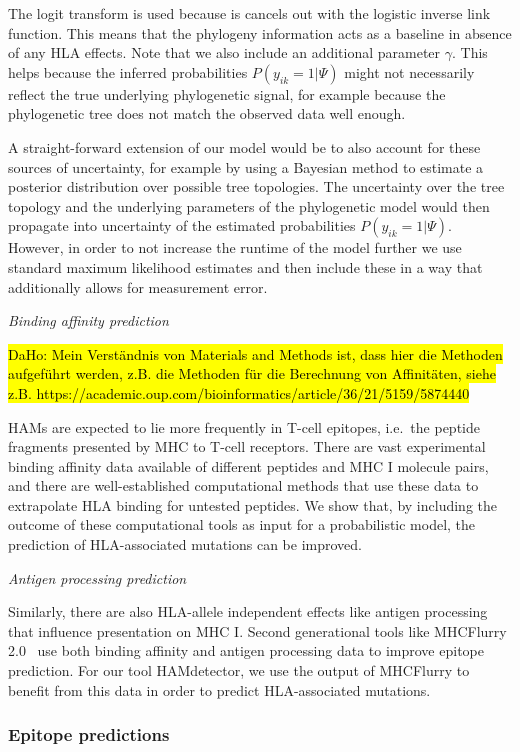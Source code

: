 \documentclass{bioinfo}
\begin{document}
\begin{methods}
The logit transform is used because is cancels out with the logistic inverse link function. This means that the phylogeny information acts as a baseline in absence of any HLA effects. Note that we also include an additional parameter \(\gamma\). This helps because the inferred probabilities \(P(y_{ik}=1|\Psi)\) might not necessarily reflect the true underlying phylogenetic signal, for example because the phylogenetic tree does not match the observed data well enough.

A straight-forward extension of our model would be to also account for these sources of uncertainty, for example by using a Bayesian method to estimate a posterior distribution over possible tree topologies. The uncertainty over the tree topology and the underlying parameters of the phylogenetic model would then propagate into uncertainty of the estimated probabilities \(P(y_{ik}=1|\Psi)\). However, in order to not increase the runtime of the model further we  use standard maximum likelihood estimates and then include these in a way that additionally allows for measurement error.

\textit{Binding affinity prediction}

\hl{DaHo: Mein Verständnis von Materials and Methods ist, dass hier die Methoden aufgeführt werden, z.B. die Methoden für die Berechnung von Affinitäten, siehe z.B. https://academic.oup.com/bioinformatics/article/36/21/5159/5874440}
  
    HAMs are expected to lie more frequently in T-cell epitopes, i.e.\ the peptide fragments presented by MHC to T-cell receptors. There are vast experimental binding affinity data available of different peptides and MHC I molecule pairs, and there are well-established computational methods that use these data to extrapolate HLA binding for untested peptides. We show that, by including the outcome of these computational tools as input for a probabilistic model, the prediction of HLA-associated mutations can be improved.

  \textit{Antigen processing prediction}
  
    Similarly, there are also HLA-allele independent effects like antigen processing that influence presentation on MHC I. Second generational tools like MHCFlurry 2.0~\citep{ODonnell2020} use both binding affinity and antigen processing data to improve epitope prediction. For our tool HAMdetector, we use the output of MHCFlurry to benefit from this data in order to predict HLA-associated mutations.

    \subsubsection{Epitope predictions}


\end{methods}
\end{document}

